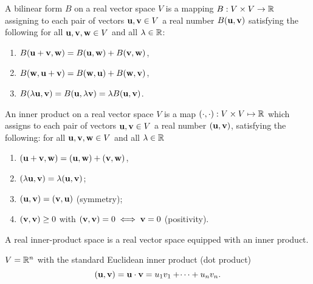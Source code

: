 \documentclass[10pt, a4paper]{article}
\begin{document}
\begin{definition}
    A bilinear form $B$ on a real vector space $V$ is a mapping $B : V \times V \rightarrow \mathbb{R}$ assigning to each pair of vectors $\mathbf{u}, \mathbf{v} \in V$ a real number $B(\mathbf{u}, \mathbf{v})$ satisfying the following for all $\mathbf{u}, \mathbf{v}, \mathbf{w} \in V$ and all $\lambda \in \mathbb{R}$:
    \begin{enumerate}[label = (\roman*)]
        \item $B(\mathbf{u} + \mathbf{v}, \mathbf{w}) = B(\mathbf{u}, \mathbf{w}) + B(\mathbf{v}, \mathbf{w})$,
        
        \item $B(\mathbf{w}, \mathbf{u} + \mathbf{v}) = B(\mathbf{w}, \mathbf{u}) + B(\mathbf{w}, \mathbf{v})$,
        
        \item $B(\lambda\mathbf{u}, \mathbf{v}) = B(\mathbf{u}, \lambda\mathbf{v}) = \lambda B(\mathbf{u}, \mathbf{v})$.
    \end{enumerate}
\end{definition}

\begin{definition}
    An inner product on a real vector space $V$ is a map $(\cdot,\cdot) : V \times V \mapsto \mathbb{R}$ which assigns to each pair of vectors $\mathbf{u}, \mathbf{v} \in V$ a real number $(\mathbf{u}, \mathbf{v})$,
    satisfying the following:
    for all $\mathbf{u}, \mathbf{v}, \mathbf{w} \in V$ and all $\lambda \in \mathbb{R}$
    \begin{enumerate}[label = (\roman*)]
        \item $(\mathbf{u} + \mathbf{v}, \mathbf{w}) = (\mathbf{u}, \mathbf{w}) + (\mathbf{v}, \mathbf{w})$,
        
        \item $(\lambda\mathbf{u}, \mathbf{v}) = \lambda (\mathbf{u}, \mathbf{v})$;

        \item $(\mathbf{u}, \mathbf{v}) = (\mathbf{v}, \mathbf{u})$
        (symmetry);

        \item $(\mathbf{v}, \mathbf{v}) \geq 0$ with $(\mathbf{v}, \mathbf{v}) = 0 \iff \mathbf{v} = 0$
        (positivity).
    \end{enumerate}
\end{definition}

\begin{definition}
    A real inner-product space is a real vector space equipped with an inner product.
\end{definition}

\begin{example}
    $V = \mathbb{R} ^ n$ with the standard Euclidean inner product
    (dot product)
    \[
    (\mathbf{u}, \mathbf{v}) = \mathbf{u} \cdot \mathbf{v} = u_1v_1 + \dotsi + u_nv_n.
    \]
\end{example}
\end{document}
